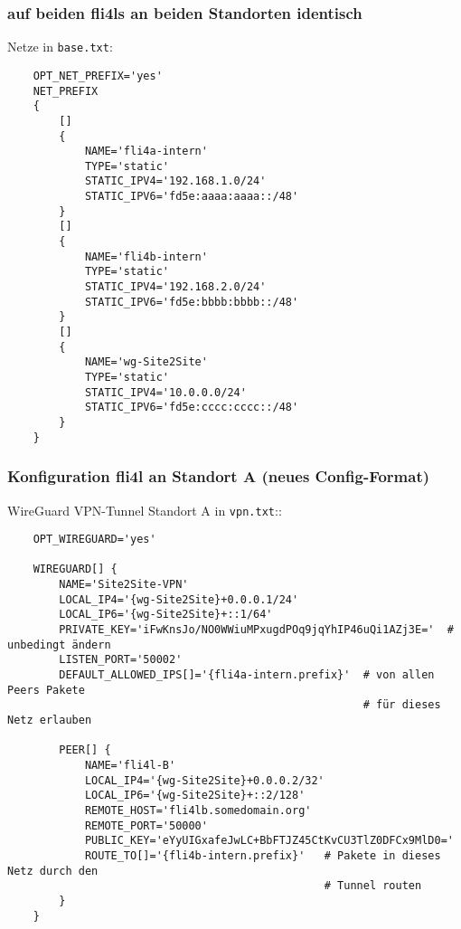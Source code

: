 \subsubsection{auf beiden fli4ls an beiden Standorten identisch}

\noindent

Netze in \verb+base.txt+:

\begin{example}
\begin{verbatim}
    OPT_NET_PREFIX='yes'
    NET_PREFIX
    {
        []
        {
            NAME='fli4a-intern'
            TYPE='static'
            STATIC_IPV4='192.168.1.0/24'
            STATIC_IPV6='fd5e:aaaa:aaaa::/48'
        }
        []
        {
            NAME='fli4b-intern'
            TYPE='static'
            STATIC_IPV4='192.168.2.0/24'
            STATIC_IPV6='fd5e:bbbb:bbbb::/48'
        }
        []
        {
            NAME='wg-Site2Site'
            TYPE='static'
            STATIC_IPV4='10.0.0.0/24'
            STATIC_IPV6='fd5e:cccc:cccc::/48'
        }
    }
\end{verbatim}
\end{example}


\subsubsection{Konfiguration fli4l an Standort A (neues Config-Format)}

\noindent

WireGuard VPN-Tunnel Standort A in \verb+vpn.txt+::

\begin{example}
\begin{verbatim}
    OPT_WIREGUARD='yes'

    WIREGUARD[] {
        NAME='Site2Site-VPN'
        LOCAL_IP4='{wg-Site2Site}+0.0.0.1/24'
        LOCAL_IP6='{wg-Site2Site}+::1/64'
        PRIVATE_KEY='iFwKnsJo/NO0WWiuMPxugdPOq9jqYhIP46uQi1AZj3E='  # unbedingt ändern
        LISTEN_PORT='50002'
        DEFAULT_ALLOWED_IPS[]='{fli4a-intern.prefix}'  # von allen Peers Pakete 
                                                       # für dieses Netz erlauben

        PEER[] {
            NAME='fli4l-B'
            LOCAL_IP4='{wg-Site2Site}+0.0.0.2/32'
            LOCAL_IP6='{wg-Site2Site}+::2/128'
            REMOTE_HOST='fli4lb.somedomain.org'
            REMOTE_PORT='50000'
            PUBLIC_KEY='eYyUIGxafeJwLC+BbFTJZ45CtKvCU3TlZ0DFCx9MlD0='
            ROUTE_TO[]='{fli4b-intern.prefix}'   # Pakete in dieses Netz durch den 
                                                 # Tunnel routen
        }
    }
\end{verbatim}
\end{example}


